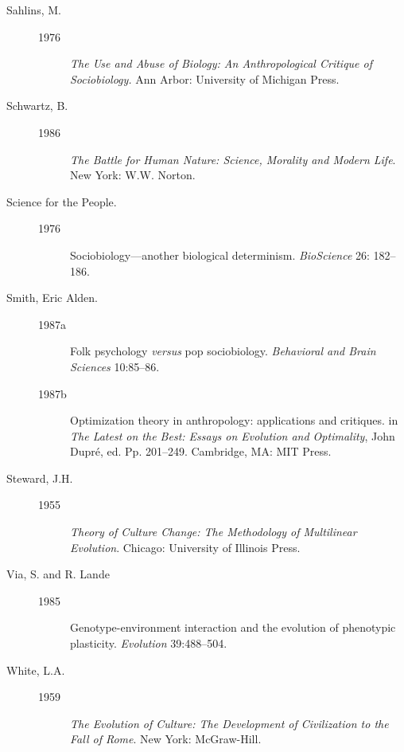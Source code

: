 \documentclass[11pt]{article}
\begin{document}
\begin{description}
\item[Sahlins, M.]
\mbox{}\begin{description}
\item[1976] \emph{The Use and Abuse of Biology: An
Anthropological Critique of Sociobiology.} Ann Arbor: University of
Michigan Press.
\end{description}

\item[Schwartz, B.]
\mbox{}\begin{description}
\item[1986] \emph{The Battle for Human Nature: Science,
Morality and Modern Life}. New York: W.W. Norton.   
\end{description}

\item[Science for the People.]
\mbox{}\begin{description}
\item[1976] Sociobiology---another biological
determinism. \emph{BioScience} 26: 182--186.
\end{description}

\item[Smith, Eric Alden.]
\mbox{}\begin{description}
\item[1987a] Folk psychology \emph{versus} pop
sociobiology. \emph{Behavioral and Brain Sciences} 10:85--86. 
\item[1987b] Optimization theory in anthropology:
applications and critiques. in \emph{The Latest on the
Best: Essays on Evolution and Optimality}, John Dupr\'e, ed.  Pp.
201--249. Cambridge, MA: MIT Press.
\end{description}

\item[Steward, J.H.]
\mbox{}\begin{description}
\item[1955] \emph{Theory of Culture Change: The Methodology
of Multilinear Evolution}. Chicago: University of Illinois Press. 
\end{description}

\item[Via, S. and R. Lande]
\mbox{}\begin{description}
\item[1985] Genotype-environment interaction and the
evolution of phenotypic plasticity. \emph{Evolution} 39:488--504.  
\end{description}

\item[White, L.A.]
\mbox{}\begin{description}
\item[1959] \emph{The Evolution of Culture: The Development of
Civilization to the Fall of Rome}. New York: McGraw-Hill.  
\end{description}


\end{description}
\end{document}
